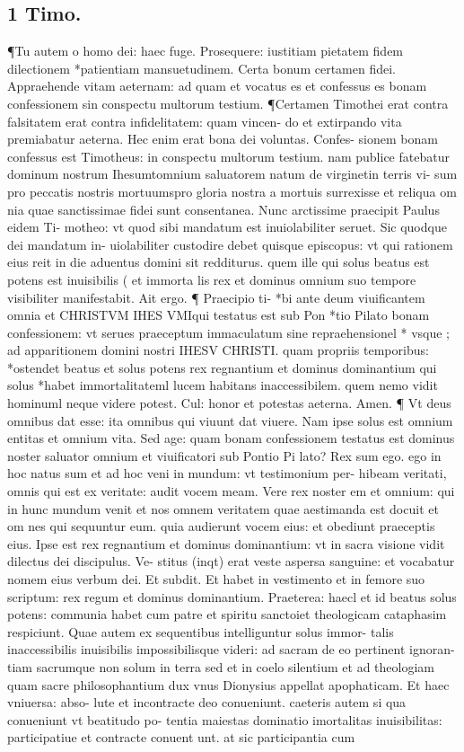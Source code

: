 \documentclass{article}
\begin{document}
\begin{pages}
\section*{1 Timo. }
\marginpar{[ p.212 ]}\pstart ¶Tu autem o homo dei: haec fuge. Prosequere: iustitiam pietatem fidem dilectionem  *patientiam mansuetudinem. Certa bonum certamen fidei. Appraehende vitam aeternam: ad quam et vocatus es et confessus es bonam confessionem sin conspectu multorum testium. ¶Certamen Timothei erat contra falsitatem erat contra infidelitatem: quam vincen- do et extirpando vita premiabatur aeterna. Hec enim erat bona dei voluntas. Confes- sionem bonam confessus est Timotheus: in conspectu multorum testium. nam publice fatebatur dominum nostrum Ihesumtomnium saluatorem natum de virginetin terris vi- sum pro peccatis nostris mortuumspro gloria nostra a mortuis surrexisse et reliqua om nia quae sanctissimae fidei sunt consentanea. Nunc arctissime praecipit Paulus eidem Ti- motheo: vt quod sibi mandatum est inuiolabiliter seruet. Sic quodque dei mandatum in- uiolabiliter custodire debet quisque episcopus: vt qui rationem eius reit in die aduentus domini sit redditurus. quem ille qui solus beatus est potens est inuisibilis ( et immorta lis rex et dominus omnium suo tempore visibiliter manifestabit. Ait ergo. ¶ Praecipio ti- *bi ante deum viuificantem omnia et CHRISTVM IHES VMIqui testatus est sub Pon *tio Pilato bonam confessionem: vt serues praeceptum immaculatum sine repraehensionel * vsque ; ad apparitionem domini nostri IHESV CHRISTI. quam propriis temporibus: *ostendet beatus et solus potens rex regnantium et dominus dominantium qui solus *habet immortalitateml lucem habitans inaccessibilem. quem nemo vidit hominuml neque videre  potest. Cul: honor et potestas aeterna. Amen. ¶ Vt deus omnibus dat esse: ita omnibus qui viuunt dat viuere. Nam ipse solus est omnium entitas et omnium vita. Sed age: quam bonam confessionem testatus est dominus noster saluator omnium et viuificatori sub Pontio Pi lato? Rex sum ego. ego in hoc natus sum et ad hoc veni in mundum: vt testimonium per- hibeam veritati, omnis qui est ex veritate: audit vocem meam. Vere rex noster em et omnium: qui in hunc mundum venit et nos omnem veritatem quae aestimanda est docuit et om nes qui sequuntur eum. quia audierunt vocem eius: et obediunt praeceptis eius. Ipse est rex regnantium et dominus dominantium: vt in sacra visione vidit dilectus dei discipulus. Ve- stitus (inqt) erat veste aspersa sanguine: et vocabatur nomem eius verbum dei. Et subdit. Et habet in vestimento et in femore suo scriptum: rex regum et dominus dominantium. Praeterea: haecl et id beatus solus potens: communia habet cum patre et spiritu sanctoiet theologicam cataphasim respiciunt. Quae autem ex sequentibus intelliguntur solus immor- talis inaccessibilis inuisibilis impossibilisque videri: ad sacram de eo pertinent ignoran- tiam sacrumque non solum in terra sed et in coelo silentium et ad theologiam quam sacre philosophantium dux vnus Dionysius appellat apophaticam. Et haec vniuersa: abso- lute et incontracte deo conueniunt. caeteris autem si qua conueniunt vt beatitudo po- tentia maiestas dominatio imortalitas inuisibilitas: participatiue et contracte conuent unt. at sic participantia cum 
\end{pages}
\end{document}
